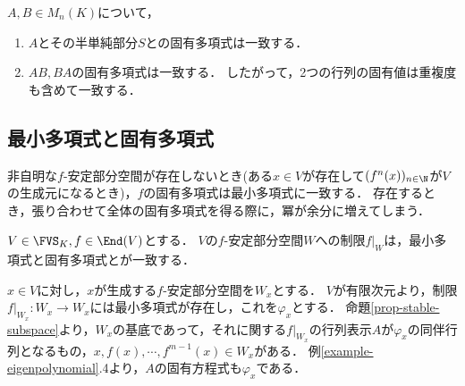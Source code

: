 \documentclass[uplatex, dvipdfmx]{jsreport}
\begin{document}
\begin{proposition}
    $A,B\in M_{n}(K)$について，
    \begin{enumerate}
        \item $A$とその半単純部分$S$との固有多項式は一致する．
        \item $AB,BA$の固有多項式は一致する．
        したがって，2つの行列の固有値は重複度も含めて一致する．
    \end{enumerate}
\end{proposition}

\subsection{最小多項式と固有多項式}

\begin{tcolorbox}[colframe=ForestGreen, colback=ForestGreen!10!white, breakable]
    非自明な$f$-安定部分空間が存在しないとき(ある$x\in V$が存在して$(f^n(x))_{n\in\N}$が$V$の生成元になるとき)，$f$の固有多項式は最小多項式に一致する．
    存在するとき，張り合わせて全体の固有多項式を得る際に，冪が余分に増えてしまう．
\end{tcolorbox}

\begin{lemma}
    $V\in\FVS_K,f\in\End(V)$とする．
    $V$の$f$-安定部分空間$W$への制限$f|_W$は，最小多項式と固有多項式とが一致する．
\end{lemma}
\begin{Proof}
    $x\in V$に対し，$x$が生成する$f$-安定部分空間を$W_x$とする．
    $V$が有限次元より，制限$f|_{W_x}:W_x\to W_x$には最小多項式が存在し，これを$\varphi_x$とする．
    命題\ref{prop-stable-subspace}より，$W_x$の基底であって，それに関する$f|_{W_x}$の行列表示$A$が$\varphi_x$の同伴行列となるもの，$x,f(x),\cdots,f^{m-1}(x)\in W_x$がある．
    例\ref{example-eigenpolynomial}.4より，$A$の固有方程式も$\varphi_x$である．
\end{Proof}
\end{document}
